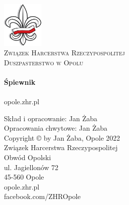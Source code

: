 \begin{titlepage}
	\begin{center}

	\includegraphics[width=0.15\textwidth]{./files/lilijka}
	\\[1cm]
	
	\textsc{\LARGE Związek Harcerstwa Rzeczypospolitej}\\[1.0cm]
	\textsc{\Large Duszpasterstwo w Opolu}\\[1.0cm]
	
	\HRule \\[0.4cm]
	{\huge \bfseries Śpiewnik \\[0.4cm] }
	\HRule \\[1.5cm]
	
	
	\vfill
	{\footnotesize opole.zhr.pl} \\ 
	
	\clearpage
	\thispagestyle{empty} 
	
	\end{center}
	
	\vspace*{\fill}
	\begin{changemargin}{1cm}{1cm} 
		\begin{flushleft}
			Skład i opracowanie: Jan Żaba \\
			Opracowania chwytowe: Jan Żaba \\
		\vspace{0.5cm}
			Copyright © by Jan Żaba, Opole 2022 \\
		\vspace{1cm}
			Związek Harcerstwa Rzeczypospolitej \\
			Obwód Opolski \\
			ul. Jagiellonów 72 \\
			45-560 Opole \\
		\vspace{0.5cm}	
			opole.zhr.pl \\
			facebook.com/ZHROpole
		\end{flushleft}
	\end{changemargin}

	
\end{titlepage}